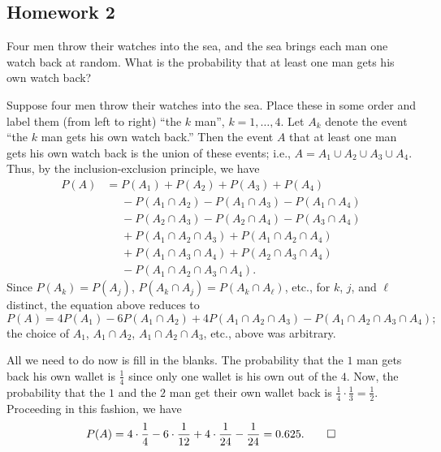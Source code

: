 \subsection{Homework 2}
\begin{problem}[Handout 2, \# 5]
  Four men throw their watches into the sea, and the sea brings each man
  one watch back at random. What is the probability that at least one man
  gets his own watch back?
\end{problem}
\begin{solution*}
  Suppose four men throw their watches into the sea. Place these in some
  order and label them (from left to right) ``the \(k\) man'',
  \(k=1,\dotsc,4\). Let \(A_k\) denote the event ``the \(k\)
  man gets his own watch back.'' Then the event \(A\) that at least one man
  gets his own watch back is the union of these events; i.e.,
  \(A=A_1\cup A_2\cup A_3\cup A_4\). Thus, by the inclusion-exclusion
  principle, we have
  \begin{align*}
    P(A)
    &=P(A_1)+P(A_2)+P(A_3)+P(A_4)\\
    &\phantom{{}={}}-P(A_1\cap A_2)-P(A_1\cap A_3)-P(A_1\cap A_4)\\
    &\phantom{{}={}}-P(A_2\cap A_3)-P(A_2\cap A_4)-P(A_3\cap A_4)\\
    &\phantom{{}={}}+P(A_1\cap A_2\cap A_3)+P(A_1\cap A_2\cap A_4)\\
    &\phantom{{}={}}+P(A_1\cap A_3\cap A_4)+P(A_2\cap A_3\cap A_4)\\
    &\phantom{{}={}}-P(A_1\cap A_2\cap A_3\cap A_4).
  \end{align*}
  Since \(P(A_k)=P(A_j)\), \(P(A_k\cap A_j)=P(A_k\cap A_\ell)\), etc., for
  \(k\), \(j\), and \(\ell\) distinct, the equation above reduces to
  \[
    P(A)=4P(A_1)-6P(A_1\cap A_2)+4P(A_1\cap A_2\cap A_3)-P(A_1\cap A_2\cap
    A_3\cap A_4);
  \]
  the choice of \(A_1\), \(A_1\cap A_2\), \(A_1\cap A_2\cap A_3\), etc.\@,
  above was arbitrary.

  All we need to do now is fill in the blanks. The probability that the
  \(1\) man gets back his own wallet is \(\frac{1}{4}\) since
  only one wallet is his own out of the \(4\). Now, the probability that
  the \(1\) and the \(2\) man get their own wallet
  back is \(\frac{1}{4}\cdot\frac{1}{3}=\frac{1}{2}\). Proceeding in this
  fashion, we have
  \[
    P(A)=4\cdot\frac{1}{4}-6\cdot\frac{1}{12}+4\cdot\frac{1}{24}-\frac{1}{24}
    =0.625.\qedhere
  \]
\end{solution*}

